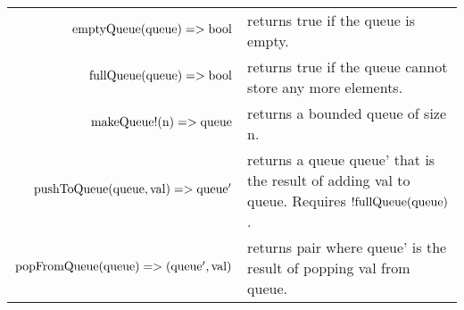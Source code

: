 \documentclass{scrartcl}
\begin{document}
    \begin{tabularx}{\textwidth}{ @{} r | Y @{} }
        $\textnormal{emptyQueue}(\textnormal{queue}) => \textnormal{bool}$ & returns true if the queue is empty. \\
        $\textnormal{fullQueue}(\textnormal{queue}) => \textnormal{bool}$ & returns true if the queue cannot store any more elements. \\
        $\textnormal{makeQueue!}(\textnormal{n}) => \textnormal{queue}$ & returns a bounded queue of size n. \\
        $\textnormal{pushToQueue}(\textnormal{queue}, \textnormal{val}) => \textnormal{queue}'$ & returns a queue queue' that is the result of adding val to queue. Requires $!\textnormal{fullQueue}(\textnormal{queue})$. \\
        $\textnormal{popFromQueue}(\textnormal{queue}) => (\textnormal{queue}', \textnormal{val})$ & returns pair where queue' is the result of popping val from queue.
    \end{tabularx}
\end{document}
